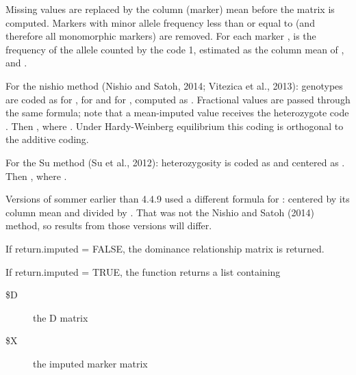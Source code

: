 \documentclass[a4paper]{book}
\begin{document}
\begin{Details}\relax

Missing values are replaced by the column (marker) mean before the matrix is computed. Markers with minor allele frequency less than or equal to  (and therefore all monomorphic markers) are removed. For each marker ,  is the frequency of the allele counted by the code 1, estimated as the column mean of , and .

For the nishio method (Nishio and Satoh, 2014; Vitezica et al., 2013): genotypes are coded as  for ,  for  and  for , computed as . Fractional values are passed through the same formula; note that a mean-imputed value  receives the heterozygote code . Then , where . Under Hardy-Weinberg equilibrium this coding is orthogonal to the additive coding.

For the Su method (Su et al., 2012): heterozygosity is coded as  and centered as . Then , where .

Versions of sommer earlier than 4.4.9 used a different formula for :  centered by its column mean and divided by . That was not the Nishio and Satoh (2014) method, so results from those versions will differ.

\end{Details}
%
\begin{Value}
If return.imputed = FALSE, the  dominance relationship matrix is returned.

If return.imputed = TRUE, the function returns a list containing
\begin{description}

\item[\$D] the D matrix
\item[\$X] the imputed marker matrix

\end{description}

\end{Value}
%
\end{document}
